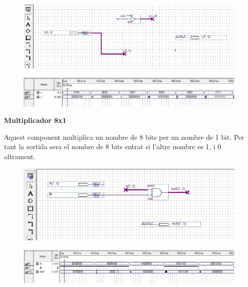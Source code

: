 \documentclass[12pt, a4papre]{article}
\begin{document}
	\begin{figure}[H]
		\begin{center}
		\includegraphics[width=150mm]{CA2_4_a_8.jpeg}
		\end{center}
	\end{figure}
	\begin{figure}[H]
		\begin{center}
		\includegraphics[width=150mm]{CA2_4A8simul.jpeg}
		\end{center}
	\end{figure}
	
	\textbf{\large{Multiplicador 8x1}}
	
	Aquest component multiplica un nombre de 8 bits per  un nombre de 1 bit. Per tant la sortida sera el nombre de 8 bits entrat si l'altre nombre es 1, i 0 altrament.
	
	\begin{figure}[H]
		\begin{center}
		\includegraphics[width=150mm]{MULT8x1.jpeg}
		\end{center}
	\end{figure}
	
	\begin{center}
	
	\begin{figure}[H]
		\begin{center}
		\includegraphics[width=150mm]{MULT8x1simul.jpeg}
		\end{center}
	\end{figure}
	
	\end{center}
	
\end{document}
